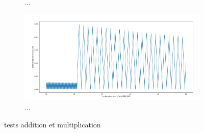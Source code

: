 \documentclass{article}
\begin{document}
\begin{figure}[ht]
\begin{subfigure}[b]{0.5\textwidth}
      \caption{...}
      \label{fig:delta_multi_big}
  \end{subfigure}
  \begin{subfigure}[b]{0.5\textwidth}
    \centering
    \includegraphics[width=\linewidth]{Partie1-delta_mult_15-20.png}
    \caption{...}
    \label{fig:delta_mult_zoom}
    \end{subfigure}
  
  \caption{tests addition et multiplication}
  
\end{figure}








 

\end{document}
